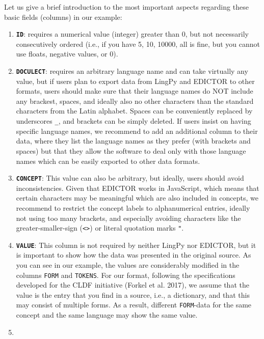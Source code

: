 \documentclass[a4paper,svgnames]{scrartcl}
\providecommand{\tightlist}{%
  \setlength{\itemsep}{0pt}\setlength{\parskip}{0pt}}
\begin{document}
Let us give a brief introduction to the most important aspects regarding
these basic fields (columns) in our example:

\begin{enumerate}
\def\labelenumi{\arabic{enumi}.}
\tightlist
\item
  \textbf{\texttt{ID}}: requires a numerical value (integer) greater
  than 0, but not necessarily consecutively ordered (i.e., if you have
  5, 10, 10000, all is fine, but you cannot use floats, negative values,
  or 0).
\item
  \textbf{\texttt{DOCULECT}}: requires an arbitrary language name and
  can take virtually any value, but if users plan to export data from
  LingPy and EDICTOR to other formats, users should make sure that their
  language names do NOT include any brackest, spaces, and ideally also
  no other characters than the standard characters from the Latin
  alphabet. Spaces can be conveniently replaced by underscores
  \texttt{\_}, and brackets can be simply deleted. If users insist on
  having specific language names, we recommend to add an additional
  column to their data, where they list the language names as they
  prefer (with brackets and spaces) but that they allow the software to
  deal only with those language names which can be easily exported to
  other data formats.
\item
  \textbf{\texttt{CONCEPT}}: This value can also be arbitrary, but
  ideally, users should avoid inconsistencies. Given that EDICTOR works
  in JavaScript, which means that certain characters may be meaningful
  which are also included in concepts, we recommend to restrict the
  concept labels to alphanumerical entries, ideally not using too many
  brackets, and especially avoiding characters like the
  greater-smaller-sign (\texttt{\textless{}\textgreater{}}) or literal
  quotation marks \texttt{"}.
\item
  \textbf{\texttt{VALUE}}: This column is not required by neither LingPy
  nor EDICTOR, but it is important to show how the data was presented in
  the original source. As you can see in our example, the values are
  considerably modified in the columns \texttt{FORM} and
  \texttt{TOKENS}. For our format, following the specifications
  developed for the CLDF initiative (Forkel et al. 2017), we assume that
  the value is the entry that you find in a source, i.e., a dictionary,
  and that this may consist of multiple forms. As a result, different
  \texttt{FORM}-data for the same concept and the same language may show
  the same value.
\item

\end{enumerate}
\end{document}
